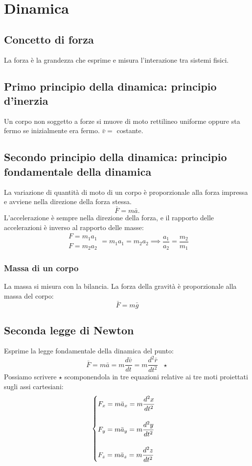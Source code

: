\documentclass[../../main.tex]{subfiles}
\begin{document}
\section{Dinamica}
\subsection{Concetto di forza}
La forza è la grandezza che esprime e misura l'interazione tra sistemi fisici.
\subsection{Primo principio della dinamica: principio d'inerzia}
Un corpo non soggetto a forze si muove di moto rettilineo uniforme oppure sta fermo se inizialmente era fermo. $\bar v =$ costante.
\subsection{Secondo principio della dinamica: principio fondamentale della dinamica}
La variazione di quantità di moto di un corpo è proporzionale alla forza impressa e avviene nella direzione della forza stessa. \[\bar F = m \bar a.\]
L'accelerazione è sempre nella direzione della forza, e il rapporto delle accelerazioni è inverso al rapporto delle masse:
\[
    \begin{array}{lr}
        F = m_1 a_1 \\
        F = m_2 a_2
    \end{array} = m_1 a_1 = m_2 a_2 \implies \frac{a_1}{a_2} = \frac{m_2}{m_1}
\]

\subsubsection{Massa di un corpo}
La massa si misura con la bilancia. La forza della gravità è proporzionale alla massa del corpo:
\[
    \bar F = m \bar g
\]
\subsection{Seconda legge di Newton}
Esprime la legge fondamentale della dinamica del punto:
\[
    \bar F = m\bar{a} = m\dfrac{d\bar v}{dt} = m\dfrac{d^2\bar{r}}{dt^2} \ \ \ \star
\]
Possiamo scrivere $\star$ scomponendola in tre equazioni relative ai tre moti proiettati sugli assi cartesiani:
\[
    \begin{cases}
        F_x = m\bar{a}_x = m\dfrac{d^2x}{dt^2} \\
        \vspace{1px}                           \\
        F_y = m\bar{a}_y = m\dfrac{d^2y}{dt^2} \\
        \vspace{1px}                           \\
        F_z = m\bar{a}_z = m\dfrac{d^2z}{dt^2}
    \end{cases}
\]
\end{document}
